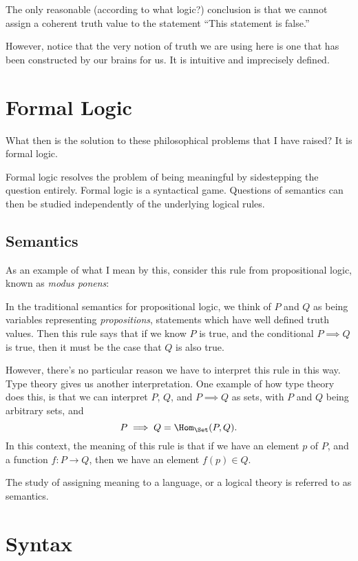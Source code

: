 \documentclass{article}
\theoremstyle{remark}
\begin{document}
The only reasonable (according to what logic?)
conclusion is that we cannot assign a coherent 
truth value to the statement 
``This statement is false.''

However, notice that the very notion of truth we are using here 
is one that has been constructed by our brains for us. It is 
intuitive and imprecisely defined. 

\section{Formal Logic}

What then is the solution to these 
philosophical problems that I have raised?
It is formal logic. 

Formal logic resolves the problem of being meaningful by 
sidestepping the question entirely. Formal logic is a 
syntactical game. Questions of semantics can then be studied
independently of the underlying logical rules. 

\subsection{Semantics}

As an example of what I mean by this, consider this rule from 
propositional logic, known as \emph{modus ponens}:
\begin{prooftree}
\end{prooftree}

In the traditional semantics for propositional logic,
we think of $P$ and $Q$ as being variables representing 
\emph{propositions}, statements which have well defined 
truth values. Then this rule says that if we know $P$ is true,
and the conditional $P\implies Q$ is true, then it must be the 
case that $Q$ is also true. 

However, there's no particular reason we have 
to interpret this rule in this way. Type theory gives us another
interpretation. One example of how type theory does this, 
is that we can interpret $P$, $Q$, and $P\implies Q$ as sets,
with $P$ and $Q$ being arbitrary sets, and 
\[ P\implies Q = \Hom_{\Set}(P,Q). \]
In this context, the meaning of this rule is that 
if we have an element $p$ of $P$, and a function $f:P\to Q$, 
then we have an element $f(p)\in Q$.

The study of assigning meaning to a language, or a 
logical theory is referred to as semantics.

\section{Syntax}
\end{document}

